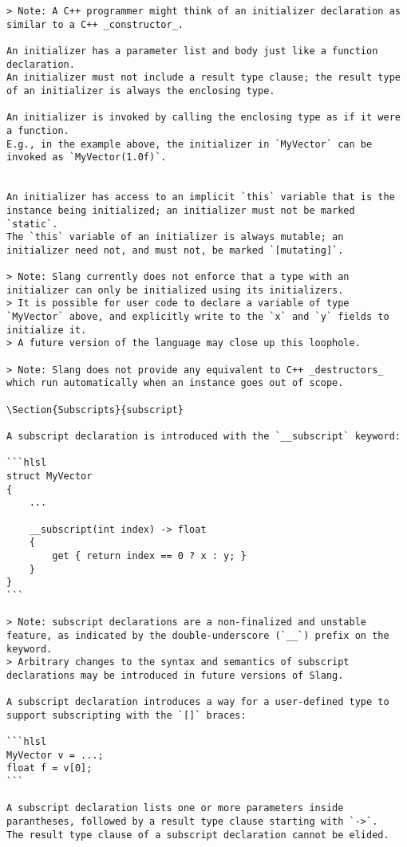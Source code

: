 \begin{verbatim}
> Note: A C++ programmer might think of an initializer declaration as similar to a C++ _constructor_.

An initializer has a parameter list and body just like a function declaration.
An initializer must not include a result type clause; the result type of an initializer is always the enclosing type.

An initializer is invoked by calling the enclosing type as if it were a function.
E.g., in the example above, the initializer in `MyVector` can be invoked as `MyVector(1.0f)`.


An initializer has access to an implicit `this` variable that is the instance being initialized; an initializer must not be marked `static`.
The `this` variable of an initializer is always mutable; an initializer need not, and must not, be marked `[mutating]`.

> Note: Slang currently does not enforce that a type with an initializer can only be initialized using its initializers.
> It is possible for user code to declare a variable of type `MyVector` above, and explicitly write to the `x` and `y` fields to initialize it.
> A future version of the language may close up this loophole.

> Note: Slang does not provide any equivalent to C++ _destructors_ which run automatically when an instance goes out of scope.

\Section{Subscripts}{subscript}

A subscript declaration is introduced with the `__subscript` keyword:

```hlsl
struct MyVector
{
    ...

    __subscript(int index) -> float
    {
        get { return index == 0 ? x : y; }
    }
}
```

> Note: subscript declarations are a non-finalized and unstable feature, as indicated by the double-underscore (`__`) prefix on the keyword.
> Arbitrary changes to the syntax and semantics of subscript declarations may be introduced in future versions of Slang.

A subscript declaration introduces a way for a user-defined type to support subscripting with the `[]` braces:

```hlsl
MyVector v = ...;
float f = v[0];
```

A subscript declaration lists one or more parameters inside parantheses, followed by a result type clause starting with `->`.
The result type clause of a subscript declaration cannot be elided.


\end{verbatim}
